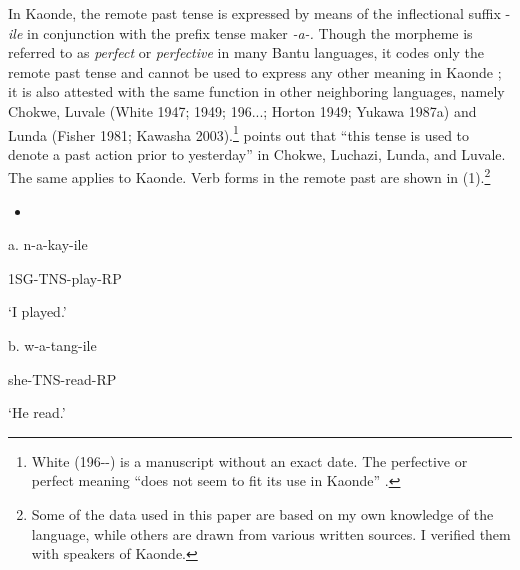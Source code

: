 \documentclass[output=paper]{langsci/langscibook}
\begin{document}
\begin{styleBodyTextIndent}
In Kaonde, the remote past tense is expressed by means of the inflectional suffix -\emph{ile} in conjunction with the prefix tense maker \emph{{}-a-}\textit{.} Though the morpheme is referred to as \emph{perfect} or \emph{perfective} in many Bantu languages, it codes only the remote past tense and cannot be used to express any other meaning in Kaonde \citep[137]{Wright1977}; it is also attested with the same function in other neighboring languages, namely Chokwe, Luvale (White 1947; 1949; 196...; Horton 1949; Yukawa 1987a) and Lunda (Fisher 1981; Kawasha 2003).\footnote{ White (196-{}-) is a manuscript without an exact date. The perfective or perfect meaning “does not seem to fit its use in Kaonde” \citep{Wright1997}.} \citet[6]{White1947} points out that “this tense is used to denote a past action prior to yesterday” in Chokwe, Luchazi, Lunda, and Luvale. The same applies to Kaonde. Verb forms in the remote past are shown in (1).\footnote{ Some of the data used in this paper are based on my own knowledge of the language, while others are drawn from various written sources. I verified them with speakers of Kaonde.}
\end{styleBodyTextIndent}

\begin{itemize}
\item \end{itemize}
\begin{stylelsSourceline}
a.  n-a-kay-ile
\end{stylelsSourceline}

\begin{stylelsIMT}
  1SG-TNS{}-play-RP
\end{stylelsIMT}

\begin{stylelsTranslationSubexample}
  ‘I played.’
\end{stylelsTranslationSubexample}

\begin{stylelsSourceline}
b.  w-a-tang-ile
\end{stylelsSourceline}

\begin{stylelsIMT}
  she{}-TNS{}-read-RP
\end{stylelsIMT}

\begin{stylelsTranslationSubexample}
  ‘He read.’
\end{stylelsTranslationSubexample}
\end{document}
